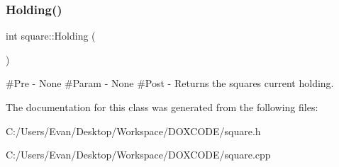 \subsubsection{\texorpdfstring{Holding()}{Holding()}\hspace{0.1cm}{\footnotesize\ttfamily [2/2]}}
{\footnotesize\ttfamily int square\+::\+Holding (\begin{DoxyParamCaption}{ }\end{DoxyParamCaption})}

\#\+Pre -\/ None \#\+Param -\/ None \#\+Post -\/ Returns the square\textquotesingle{}s current holding. 

The documentation for this class was generated from the following files\+:\begin{DoxyCompactItemize}
\item 
C\+:/\+Users/\+Evan/\+Desktop/\+Workspace/\+D\+O\+X\+C\+O\+D\+E/square.\+h\item 
C\+:/\+Users/\+Evan/\+Desktop/\+Workspace/\+D\+O\+X\+C\+O\+D\+E/square.\+cpp\end{DoxyCompactItemize}
